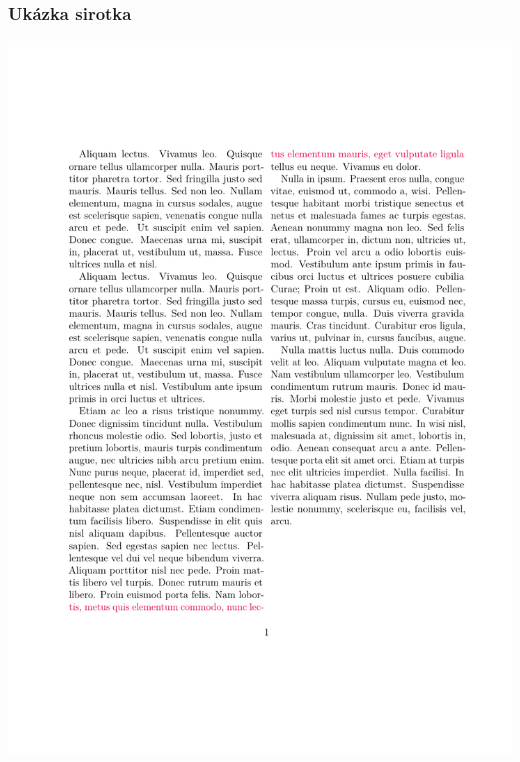 \begin{frame}
  \frametitle{Ukázka sirotka}
  \begin{center}
    \includegraphics[height=\textheight,page=1]{examples/widow.pdf}
  \end{center}
\end{frame}

